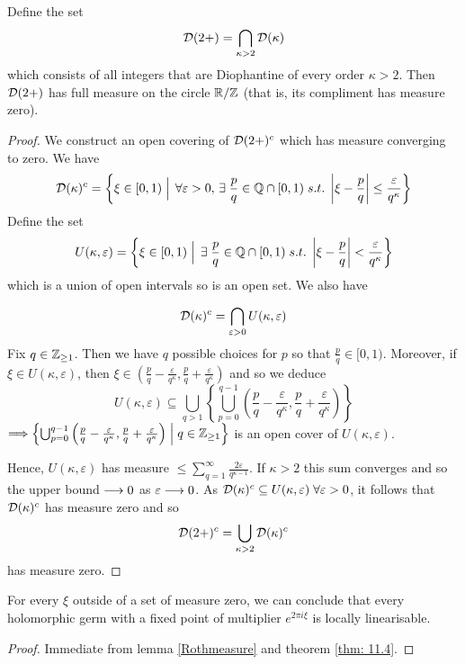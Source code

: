 \documentclass[../main.tex]{subfiles}
\begin{document}
\begin{lem}\label{Rothmeasure}
Define the set
\[
\mathcal{D}(2+) = \bigcap_{\kappa > 2} \mathcal{D}(\kappa)
\]
which consists of all integers that are Diophantine of every order $\kappa > 2$. Then $\mathcal{D}(2+)$ has full measure on the circle $\mathbb{R}/\mathbb{Z}$ (that is, its compliment has measure zero).
\end{lem}
\begin{proof}
We construct an open covering of $\mathcal{D}(2+)^c$ which has measure converging to zero. We have 
\[
\mathcal{D}(\kappa)^c = \left\{\xi \in [0,1) \mathrel{\Big|}\, \forall \varepsilon > 0,\, \exists\; \frac{p}{q} \in \mathbb{Q} \cap [0,1)\; s.t. \; \left|\xi - \frac{p}{q}\right| \leq \frac{\varepsilon}{q^\kappa} \right\}
\]
Define the set
\[
U(\kappa, \varepsilon) = \left\{\xi \in [0,1) \mathrel{\Big|} \, \exists\; \frac{p}{q} \in \mathbb{Q} \cap [0,1) \; s.t. \; \left|\xi - \frac{p}{q}\right| < \frac{\varepsilon}{q^\kappa} \right\}
\]
which is a union of open intervals so is an open set. We also have

\[
\mathcal{D}(\kappa)^c = \bigcap_{\varepsilon > 0} U(\kappa, \varepsilon)
\]
Fix $q \in \mathbb{Z}_{\geq 1}$. Then we have $q$ possible choices for $p$ so that $\frac{p}{q} \in [0,1)$. Moreover, if $\xi \in U(\kappa, \varepsilon)$, then $\xi \in \left(\frac{p}{q} - \frac{\varepsilon}{q^{\kappa}}, \frac{p}{q} + \frac{\varepsilon}{q^{\kappa}}\right)$ and so we deduce
\[
U(\kappa, \varepsilon) \subseteq \bigcup_{q>1}\left\{\bigcup_{p=0}^{q-1} \left(\frac{p}{q} - \frac{\varepsilon}{q^{\kappa}}, \frac{p}{q} + \frac{\varepsilon}{q^{\kappa}}\right) \right\}
\]
$\Longrightarrow \left\{\bigcup_{p=0}^{q-1} \left(\frac{p}{q} - \frac{\varepsilon}{q^{\kappa}}, \frac{p}{q} + \frac{\varepsilon}{q^{\kappa}}\right) \mathrel{\Big|} q \in \mathbb{Z}_{\geq 1}\right\}$ is an open cover of $U(\kappa, \varepsilon)$.

Hence, $U(\kappa, \varepsilon)$ has measure $\leq \sum_{q=1}^{\infty} \frac{2\varepsilon}{q^{\kappa - 1}}$. If $\kappa > 2$ this sum converges and so the upper bound $\longrightarrow 0$ as $\varepsilon \longrightarrow 0$. As $\mathcal{D}(\kappa)^c \subseteq U(\kappa, \varepsilon)\; \forall \varepsilon > 0$, it follows that $\mathcal{D}(\kappa)^c$ has measure zero and so
\[
\mathcal{D}(2+)^c = \bigcup_{\kappa > 2} \mathcal{D}(\kappa)^c
\]
has measure zero.
\end{proof} 

\begin{cor}
For every $\xi$ outside of a set of measure zero, we can conclude that every holomorphic germ with a
fixed point of multiplier $e^{2\pi i \xi}$ is locally linearisable.
\end{cor}
\begin{proof}
Immediate from lemma \eqref{Rothmeasure} and theorem \eqref{thm: 11.4}. 
\end{proof}
\end{document}

